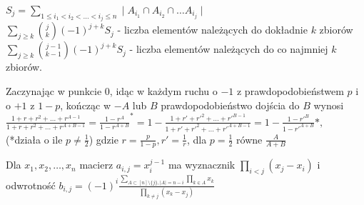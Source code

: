 $S_j = \sum\limits_{1\leq i_1<i_2<\ldots<i_j\leq n} \mid A_{i_1}\cap A_{i_2} \cap \ldots A_{i_j} \mid$\\
$\sum\limits_{j\geq k}{j \choose k}(-1)^{j + k}S_j$ - liczba elementów należących do dokładnie $k$ zbiorów\\
$\sum\limits_{j\geq k}{j - 1 \choose k - 1}(-1)^{j + k}S_j$ - liczba elementów należących do co najmniej $k$ zbiorów.

Zaczynając w punkcie $0$, idąc w każdym ruchu o $-1$ z prawdopodobieństwem $p$ i o $+1$ z $1 - p$, kończąc w $-A$ lub $B$ prawdopodobieństwo dojścia do $B$ wynosi
$\frac{1 + r + r^2 + \ldots + r^{A - 1}}{1 + r + r^2 + \ldots + r^{A + B - 1}} = \frac{1 - r^A}{1 - r^{A + B}}^* = 1 - \frac{1 + r' + r'^2 + \ldots + r'^{B - 1}}{1 + r' + r'^2 + \ldots + r'^{A + B - 1}} = 1 - \frac{1 - r'^B}{1 - r'^{A + B}}*,$ \\ (*działa o ile $p \neq \frac12$) gdzie $r = \frac{p}{1 - p}, r' = \frac1r$, dla $p=\frac12$ równe $\frac{A}{A+B}$

Dla $x_1, x_2, \ldots, x_n$ macierz $a_{i,j}=x_i^{j - 1}$ ma wyznacznik $\prod\limits_{i<j}(x_j - x_i)$ i odwrotność
$b_{i,j} = (-1)^i\frac{\sum\limits_{A \subset [n]\setminus \lbrace j \rbrace, |A| = n - i}\prod\limits_{k \in A} x_k}{\prod\limits_{k\neq j}(x_k - x_j)}$

